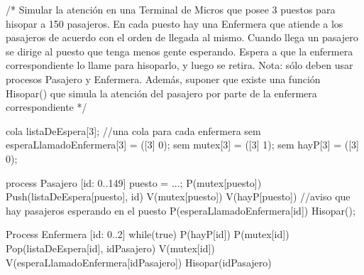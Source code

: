 /* Simular la atención en una Terminal de Micros que posee 3 puestos para hisopar a
150 pasajeros. En cada puesto hay una Enfermera que atiende a los pasajeros de acuerdo
con el orden de llegada al mismo. Cuando llega un pasajero se dirige al puesto que tenga
menos gente esperando. Espera a que la enfermera correspondiente lo llame para
hisoparlo, y luego se retira.
Nota: sólo deben usar procesos Pasajero y Enfermera.
Además, suponer que existe una función Hisopar() que simula la atención del pasajero por
parte de la enfermera correspondiente */

cola listaDeEspera[3]; //una cola para cada enfermera
sem esperaLlamadoEnfermera[3] = ([3] 0);
sem mutex[3] = ([3] 1);
sem hayP[3] = ([3] 0);


process Pasajero [id: 0..149]
{
    puesto = ...;
    P(mutex[puesto])
    Push(listaDeEspera[puesto], id)
    V(mutex[puesto])
    V(hayP[puesto]) //aviso que hay pasajeros esperando en el puesto
    P(esperaLlamadoEnfermera[id])
    Hisopar();
}

Process Enfermera [id: 0..2]
{
    while(true)
    {
        P(hayP[id])
        P(mutex[id])
        Pop(listaDeEspera[id], idPasajero)
        V(mutex[id])
        V(esperaLlamadoEnfermera[idPasajero])
        Hisopar(idPasajero)
    }
}